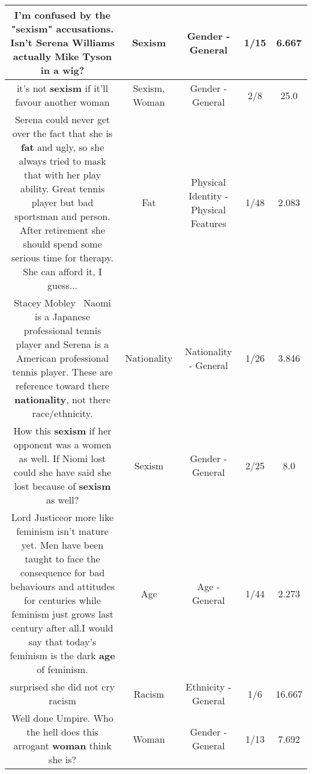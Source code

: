 \documentclass[11pt]{article}
\newlength\mylength
\begin{document}
\begin{center}
\begin{longtable}{|C{.65\mylength}|C{.30\mylength}|C{.12\mylength}|C{.12\mylength}|C{.12\mylength}|}
  \small I'm confused by the "\textbf{sexism}" accusations. Isn't Serena Williams actually Mike Tyson in a wig?\normalsize   & Sexism & Gender - General & 1/15 & 6.667 \\  \hline
  \small it's not \textbf{sexism} if it'll favour another woman\normalsize   & Sexism, Woman & Gender - General & 2/8 & 25.0 \\  \hline
  \small Serena could never get over the fact that she is \textbf{fat} and ugly, so she always tried to mask that with her play ability. Great tennis player but bad sportsman and person. After retirement she should spend some serious time for therapy. She can afford it, I guess...\normalsize   & Fat & Physical Identity - Physical Features & 1/48 & 2.083 \\  \hline
  \small Stacey Mobley  Naomi is a Japanese professional tennis player and Serena is a American professional tennis player. These are reference toward there \textbf{nationality}, not there race/ethnicity.\normalsize   & Nationality & Nationality - General & 1/26 & 3.846 \\  \hline
  \small How this \textbf{sexism} if her opponent was a women as well. If Niomi lost could she have said she lost because of \textbf{sexism} as well?\normalsize   & Sexism & Gender - General & 2/25 & 8.0 \\  \hline
  \small Lord Justiceor more like feminism isn't mature yet. Men have been taught to face the consequence for bad behaviours and attitudes for centuries while feminism just grows last century after all.I would say that today's feminism is the dark \textbf{age} of feminism.\normalsize   & Age & Age - General & 1/44 & 2.273 \\  \hline
  \small surprised she did not cry racism\normalsize   & Racism & Ethnicity - General & 1/6 & 16.667 \\  \hline
  \small Well  done Umpire.  Who  the hell does  this arrogant  \textbf{woman}  think  she is?\normalsize   & Woman & Gender - General & 1/13 & 7.692 \\  \hline

\end{longtable}
\end{center}
\end{document}
